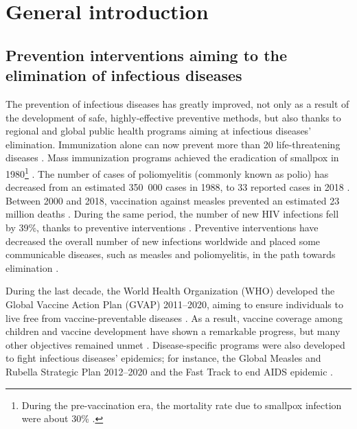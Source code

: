 \chapter{General introduction} 
\label{Introduction} 


\section{Prevention interventions aiming to the elimination of infectious diseases}
\label{Intro:Prevention}

The prevention of infectious diseases has greatly improved, not only as a result of the development of safe, highly-effective preventive %
methods, but also thanks to regional and global public health programs aiming at infectious diseases' elimination. Immunization alone can now prevent more than 20 life-threatening diseases \cite[]{WHO_IA2030}. Mass immunization programs achieved the eradication of smallpox in 1980\footnote{During the pre-vaccination era, the mortality rate due to smallpox infection were about 30\% \cite[]{CDC_Smallpox2001}.} \cite[]{CDC_Smallpox2001}. The number of cases of poliomyelitis (commonly known as polio) has decreased from an estimated 350~000 cases in 1988, to 33 reported cases in 2018 \cite[]{WHO_Factsheet_Polio}. %
Between 2000 and 2018, vaccination against measles prevented an estimated 23 million deaths \cite[]{WHO_Factsheet_Measles}. During the same period, the number of new HIV infections fell by 39\%, thanks to preventive interventions \cite[]{WHO_Factsheet_HIV}. Preventive interventions have decreased the overall number of new infections worldwide \cite[]{CDC_10achievements} and placed some communicable diseases, such as measles and poliomyelitis, in the path towards elimination \cite[]{CDC_10achievements}. 
 
During the last decade, the World Health Organization (WHO) developed the Global Vaccine Action Plan (GVAP) 2011--2020, aiming to ensure individuals to live free from vaccine-preventable diseases \cite[]{GVAP_Review2020}. As a result, vaccine coverage among children and vaccine development have shown a remarkable progress, but many other objectives remained unmet \cite[]{GVAP_Review2020}. Disease-specific programs were also developed to fight infectious diseases' epidemics; for instance, the Global Measles and Rubella Strategic Plan 2012--2020 \cite[]{WHO_MR2012} and the Fast Track to end AIDS epidemic \cite[]{UNAIDS_EndAIDS2011}. 

